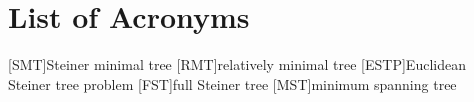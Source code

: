 {
\abnormalparskip{0pt}
\chapter{List of Acronyms}
}

\begin{acronym}
  [SMT]{Steiner minimal tree}
  [RMT]{relatively minimal tree}
  [ESTP]{Euclidean Steiner tree problem}
  [FST]{full Steiner tree}
  [MST]{minimum spanning tree}
\end{acronym}

